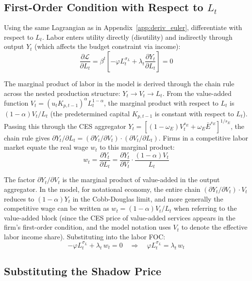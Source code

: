 \documentclass[12pt, a4paper]{article}
\begin{document}
\subsection*{First-Order Condition with Respect to $L_t$}

Using the same Lagrangian as in Appendix~\ref{app:deriv_euler}, differentiate with respect to $L_t$. Labor enters utility directly (disutility) and indirectly through output $Y_t$ (which affects the budget constraint via income):
\begin{equation*}
\frac{\partial \mathcal{L}}{\partial L_t}
= \beta^t\left[-\varphi L_t^{\sigma_L} + \lambda_t \frac{\partial Y_t}{\partial L_t}\right] = 0
\end{equation*}

\noindent The marginal product of labor in the model is derived through the chain rule across the nested production structure: $Y_t \to V_t \to L_t$. From the value-added function $V_t = (u_t K_{p,t-1})^\alpha L_t^{1-\alpha}$, the marginal product with respect to $L_t$ is $(1-\alpha)V_t/L_t$ (the predetermined capital $K_{p,t-1}$ is constant with respect to $L_t$). Passing this through the CES aggregator $Y_t = [(1-\omega_E)V_t^{s_E} + \omega_E \bar{E}^{s_E}]^{1/s_E}$, the chain rule gives $\partial Y_t/\partial L_t = (\partial Y_t / \partial V_t)\cdot(\partial V_t / \partial L_t)$. Firms in a competitive labor market equate the real wage $w_t$ to this marginal product:
\begin{equation*}
w_t = \frac{\partial Y_t}{\partial L_t}
= \frac{\partial Y_t}{\partial V_t} \cdot \frac{(1-\alpha)V_t}{L_t}
\end{equation*}

The factor $\partial Y_t / \partial V_t$ is the marginal product of value-added in the output aggregator. In the model, for notational economy, the entire chain $(\partial Y_t/\partial V_t)\cdot V_t$ reduces to $(1-\alpha)Y_t$ in the Cobb-Douglas limit, and more generally the competitive wage can be written as $w_t = (1-\alpha) V_t / L_t$ when referring to the value-added block (since the CES price of value-added services appears in the firm's first-order condition, and the model notation uses $V_t$ to denote the effective labor income share). Substituting into the labor FOC:
\begin{equation*}
-\varphi L_t^{\sigma_L} + \lambda_t \, w_t = 0
\quad \Longrightarrow \quad
\varphi L_t^{\sigma_L} = \lambda_t \, w_t
\end{equation*}

\subsection*{Substituting the Shadow Price}
\end{document}
